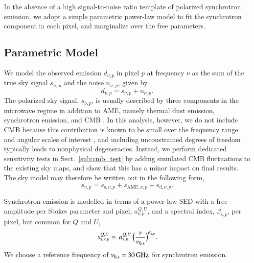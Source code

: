 \documentclass[twocolumn]{aa}
\begin{document}
In the absence of a high signal-to-noise ratio template of polarized
synchrotron emission, we adopt a simple parametric power-law model to
fit the synchrotron component in each pixel, and marginalize over the
free parameters.

\subsection{Parametric Model}\label{sub:sky_model}

We model the observed emission ${d}_{\nu,p}$ in pixel $p$ at frequency $\nu$ as the sum of the true sky signal  ${s}_{\nu,\, p}$ and the noise ${n}_{\nu,\, p}$, given by
\begin{equation}
{d}_{\nu, p} = {s}_{\nu,p} + {n}_{\nu,p}.
\label{eq:data_model}
\end{equation}
The polarized sky signal, $s_{\nu,p}$, is usually described by three components in the microwave regime in addition to AME, namely thermal dust emission, synchrotron emission, and CMB \citep{planck2014-a31,planck2016-l04,bp14}. In this analysis, however, we do not include CMB because this contribution is known to be small over the frequency range and angular scales of interest \citep{planck2016-l05}, and including unconstrained degrees of freedom typically leads to nonphysical degeneracies. Instead, we perform dedicated sensitivity tests in Sect.~\ref{sub:cmb_test} by adding simulated CMB fluctuations to the existing sky maps, and show that this has a minor impact on final results. The sky model may therefore be written out in the following form,
\begin{equation}
{s}_{\nu,p} = {s}_{\mathrm{s},\nu,p} + {s}_{\mathrm{AME},\nu,p} + {s}_{\mathrm{d},\nu,p}. \label{eq:sky_simple} 
\end{equation}

Synchrotron emission is modelled  in terms of a power-law SED with a free amplitude per Stokes parameter and pixel, $a^{Q,U}_{\mathrm{s},p}$, and a spectral index, $\beta_{\mathrm{s},p}$, per pixel, but common for $Q$ and $U$,
\begin{equation}
s^{Q,U}_{\mathrm{s},\nu,p} =\, a^{Q,U}_{\mathrm{s},p} \,\Big(\frac{\nu}{\nu_{\rm 0, s}}\Big)^{\beta_{\mathrm{s},p}}.
\label{eq:synch}
\end{equation}
We choose a reference frequency of $\nu_{\rm 0, s}=30\,{\rm GHz}$ for synchrotron emission. 
\end{document}
